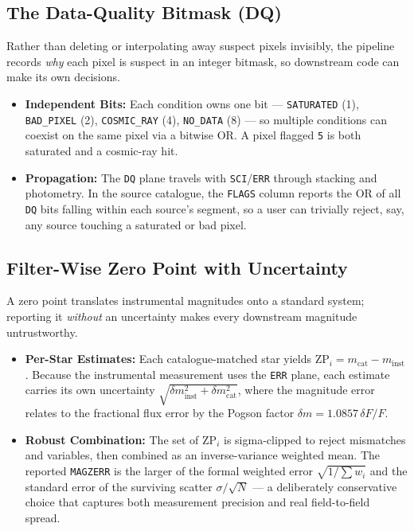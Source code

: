 \documentclass[11pt,a4paper]{article}
\begin{document}
\subsection{The Data-Quality Bitmask (DQ)}\label{app:dqmask}
Rather than deleting or interpolating away suspect pixels invisibly, the pipeline records \emph{why} each pixel is suspect in an integer bitmask, so downstream code can make its own decisions.
\begin{itemize}[leftmargin=*]
    \item \textbf{Independent Bits:} Each condition owns one bit --- \texttt{SATURATED} (1), \texttt{BAD\_PIXEL} (2), \texttt{COSMIC\_RAY} (4), \texttt{NO\_DATA} (8) --- so multiple conditions can coexist on the same pixel via a bitwise OR. A pixel flagged \texttt{5} is both saturated and a cosmic-ray hit.
    \item \textbf{Propagation:} The \texttt{DQ} plane travels with \texttt{SCI}/\texttt{ERR} through stacking and photometry. In the source catalogue, the \texttt{FLAGS} column reports the OR of all \texttt{DQ} bits falling within each source's segment, so a user can trivially reject, say, any source touching a saturated or bad pixel.
\end{itemize}

\subsection{Filter-Wise Zero Point with Uncertainty}\label{app:zeropoint}
A zero point translates instrumental magnitudes onto a standard system; reporting it \emph{without} an uncertainty makes every downstream magnitude untrustworthy.
\begin{itemize}[leftmargin=*]
    \item \textbf{Per-Star Estimates:} Each catalogue-matched star yields $\mathrm{ZP}_i = m_{\mathrm{cat}} - m_{\mathrm{inst}}$. Because the instrumental measurement uses the \texttt{ERR} plane, each estimate carries its own uncertainty $\sqrt{\delta m_{\mathrm{inst}}^2 + \delta m_{\mathrm{cat}}^2}$, where the magnitude error relates to the fractional flux error by the Pogson factor $\delta m = 1.0857\,\delta F/F$.
    \item \textbf{Robust Combination:} The set of $\mathrm{ZP}_i$ is sigma-clipped to reject mismatches and variables, then combined as an inverse-variance weighted mean. The reported \texttt{MAGZERR} is the larger of the formal weighted error $\sqrt{1/\sum w_i}$ and the standard error of the surviving scatter $\sigma/\sqrt{N}$ --- a deliberately conservative choice that captures both measurement precision and real field-to-field spread.
\end{itemize}
\end{document}
